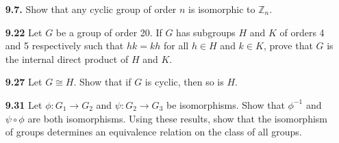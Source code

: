 \documentclass[12pt,reqno]{amsart}
\newcommand{\<}{\ensuremath{\langle}}
\renewcommand{\>}{\ensuremath{\rangle}}
\begin{document}
\begin{enumerate}[{\bf 1.}]
\vskip1cm

\item[{\bf 9.7.}] 
Show that any cyclic group of order $n$ is isomorphic to ${\mathbb Z}_n$. 

\vskip1cm

\item[{\bf 9.22}]
Let $G$ be a group of order 20. If $G$ has subgroups $H$ and $K$ of
orders 4 and 5 respectively such that $hk = kh$ for all $h \in H$ and
$k \in K$, prove that $G$ is the internal direct product of $H$ and $K$. 

\vskip1cm

\item[{\bf 9.27}]
Let $G \cong H$. Show that if $G$ is cyclic, then so is $H$.

\vskip1cm

\item[{\bf 9.31}]
Let $\phi : G_1 \rightarrow G_2$ and  $\psi : G_2 \rightarrow G_3$  be
isomorphisms. Show that  $\phi^{-1}$ and $\psi \circ \phi$ are both
isomorphisms. Using these results, show that the isomorphism of groups
determines an equivalence relation on the class of all groups.
 
\end{enumerate}
\end{document}
